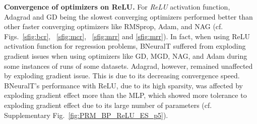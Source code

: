 \documentclass[11pt,a4paper]{article}
\begin{document}
    \textbf{Convergence of optimizers on ReLU.}
    For \textit{ReLU} activation function, Adagrad and GD being the slowest converging optimizers performed better than other faster converging optimizers like RMSprop, Adam, and NAG (cf. Figs.~\ref{sfig:bcr}, ~\ref{sfig:mcr}, ~\ref{sfig:mrr} and \ref{sfig:mrr}). In fact, when using ReLU activation function for regression problems, BNeuralT suffered from exploding gradient issues when using optimizers like GD, MGD, NAG, and Adam during some instances of runs of some datasets. Adagrad, however, remained unaffected by exploding gradient issue. This is due to its decreasing convergence speed. BNeuralT's performance with ReLU, due to its high sparsity, was affected by exploding gradient effect more than the MLP, which showed more tolerance to exploding gradient effect due to its large number of parameters (cf. Supplementary Fig.~\ref{fig:PRM_BP_ReLU_ES_p5}). 
\end{document}
